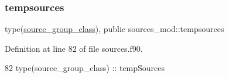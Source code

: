 \subsubsection{\texorpdfstring{tempsources}{tempsources}}
{\footnotesize\ttfamily type(\mbox{\hyperlink{structsources__mod_1_1source__group__class}{source\+\_\+group\+\_\+class}}), public sources\+\_\+mod\+::tempsources}



Definition at line 82 of file sources.\+f90.


\begin{DoxyCode}
82     \textcolor{keywordtype}{type}(source\_group\_class) :: tempSources
\end{DoxyCode}
